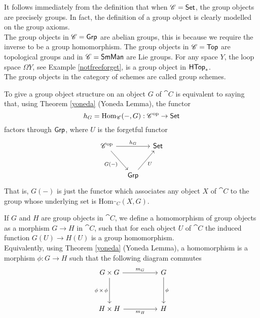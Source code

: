 \vspace*{0.1in}

\begin{example}
It follows immediately from the definition that when $\mathscr{C} = \mathsf{Set}$, the group objects are precisely groups. In fact, the definition of a group object is clearly modelled on the group axioms.\\[0.5em]
The group objects in $\mathscr{C} = \mathsf{Grp}$ are abelian groups, this is because we require the inverse to be a group homomorphism. The group objects in $\mathscr{C} = \mathsf{Top}$ are topological groups and in $\mathscr{C} = \mathsf{SmMan}$ are Lie groups. For any space $Y$, the loop space $\Omega Y$, see Example \ref{notfreeforget}, is a group object in $\mathsf{HTop}_*$.\\[0.5em]
The group objects in the category of schemes are called group schemes.
\end{example}


\begin{proposition}
To give a group object structure on an object $G$ of $\cat{C}$ is equivalent to saying that, using Theorem \ref{yoneda} (Yoneda Lemma), the functor
\[h_G = \mathrm{Hom}_{\mathscr{C}}(-,G):\mathscr{C}^{\text{op}} \to \mathsf{Set}\]
factors through $\mathsf{Grp}$, where $U$ is the forgetful functor
\[\begin{tikzcd}[row sep=large, column sep=small]
\cat{C}^{\text{op}} \arrow[rd, "G(-)"'] \arrow[rr, "h_G"] &                             & \ncat{Set} \\
                                              & \ncat{Grp} \arrow[ru, "U"'] &           
\end{tikzcd}\]
That is, $G(-)$ is just the functor which associates any object $X$ of $\cat{C}$ to the group whose underlying set is $\mathrm{Hom}_{\cat{C}}(X,G)$.
\end{proposition}

\vspace*{0.1in}

\begin{definition}
If $G$ and $H$ are group objects in $\cat{C}$, we define a homomorphism of group objects as a morphism $G \to H$ in $\cat{C}$, such that for each object $U$ of $\cat{C}$ the induced function $G(U) \to H(U)$ is a group homomorphism.\\[0.5em]
Equivalently, using Theorem \ref{yoneda} (Yoneda Lemma), a homomorphism is a morphism $\phi : G \to H$ such that the following diagram commutes
\[\begin{tikzcd}[row sep=huge, column sep = huge]
G \times G \arrow[d, "\phi\,\times\,\phi"'] \arrow[r, "m_G"] & G \arrow[d, "\phi"] \\
H \times H \arrow[r, "m_H"']                                                 & H                       
\end{tikzcd}\]
\end{definition}


